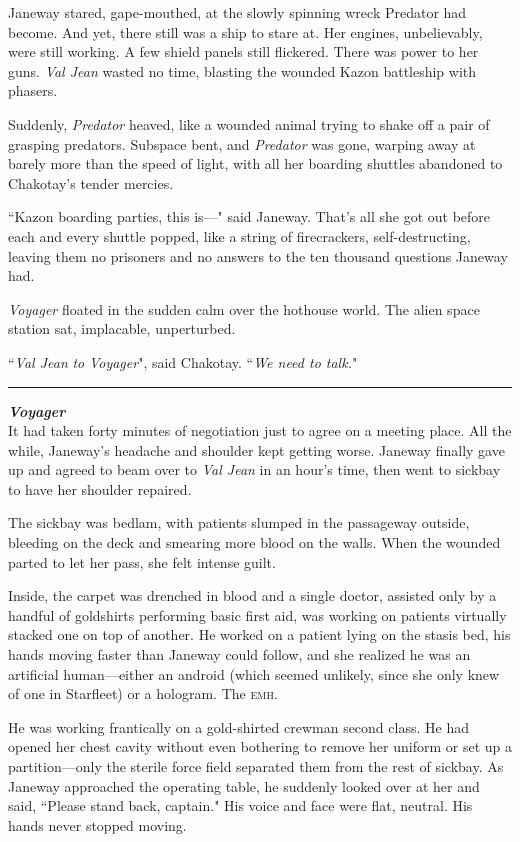 \documentclass[twoside,letterpaper,12pt]{memoir}
\begin{document}
Janeway stared, gape-mouthed, at the slowly spinning wreck Predator had become. And yet, there still was a ship to stare at. Her engines, unbelievably, were still working. A few shield panels still flickered. There was power to her guns. \textit{Val Jean} wasted no time, blasting the wounded Kazon battleship with phasers.

Suddenly, \textit{Predator} heaved, like a wounded animal trying to shake off a pair of grasping predators. Subspace bent, and \textit{Predator} was gone, warping away at barely more than the speed of light, with all her boarding shuttles abandoned to Chakotay's tender mercies.

``Kazon boarding parties, this is---" said Janeway. That's all she got out before each and every shuttle popped, like a string of firecrackers, self-destructing, leaving them no prisoners and no answers to the ten thousand questions Janeway had.

\textit{Voyager} floated in the sudden calm over the hothouse world. The alien space station sat, implacable, unperturbed.

``\textit{Val Jean} \textit{to} \textit{Voyager}", said Chakotay. ``\textit{We need to talk.}"

\fancybreak{\rule{3cm}{0.4 pt}}
\noindent\textit{\textbf{Voyager}}\\

It had taken forty minutes of negotiation just to agree on a meeting place. All the while, Janeway's headache and shoulder kept getting worse. Janeway finally gave up and agreed to beam over to \textit{Val Jean} in an hour's time, then went to sickbay to have her shoulder repaired.

The sickbay was bedlam, with patients slumped in the passageway outside, bleeding on the deck and smearing more blood on the walls. When the wounded parted to let her pass, she felt intense guilt.

Inside, the carpet was drenched in blood and a single doctor, assisted only by a handful of goldshirts performing basic first aid, was working on patients virtually stacked one on top of another. He worked on a patient lying on the stasis bed, his hands moving faster than Janeway could follow, and she realized he was an artificial human---either an android (which seemed unlikely, since she only knew of one in Starfleet) or a hologram. The \textsc{emh}.

He was working frantically on a gold-shirted crewman second class. He had opened her chest cavity without even bothering to remove her uniform or set up a partition---only the sterile force field separated them from the rest of sickbay. As Janeway approached the operating table, he suddenly looked over at her and said, ``Please stand back, captain." His voice and face were flat, neutral. His hands never stopped moving.
\end{document}
